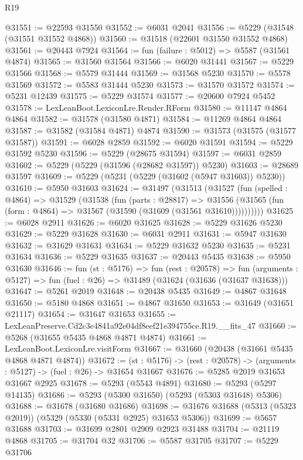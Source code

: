 \begin{lexlean}{R19}
\begin{coremodule}
@31551 := @22593 @31550
@31552 := @6031 @2041
@31556 := @5229 (@31548 (@31551 @31552 @4868))
@31560 := @31518 (@22601 @31550 @31552 @4868)
@31561 := @20443 @7924
@31564 := fun (failure : @5012) => @5587 (@31561 @4874)
@31565 := @31560 @31564
@31566 := @6020 @31441
@31567 := @5229 @31566
@31568 := @5579 @31444
@31569 := @31568 @5230
@31570 := @5578 @31569
@31572 := @5583 @31444 @5230
@31573 := @31570 @31572
@31574 := @5231 @12439
@31575 := @5229 @31574
@31577 := @20600 @7924 @5452
@31578 := LexLeanBoot.LexiconLre.Render.RForm
@31580 := @11147 @4864 @4864
@31582 := @31578 (@31580 @4871)
@31584 := @11269 @4864 @4864
@31587 := @31582 (@31584 @4871) @4874
@31590 := @31573 (@31575 (@31577 @31587))
@31591 := @6028 @2859
@31592 := @6020 @31591
@31594 := @5229 @31592 @5230
@31596 := @5229 (@28675 @31594)
@31597 := @6031 @2859
@31602 := @5229 (@5229 (@31596 (@28682 @31597)) @5230)
@31603 := @28689 @31597
@31609 := @5229 (@5231 (@5229 (@31602 (@5947 @31603)) @5230))
@31610 := @5950 @31603
@31624 := @31497
    (@31513
      (@31527
        (fun (spelled : @4864) =>
        @31529
          (@31538
            (fun (parts : @28817) =>
            @31556 (@31565 (fun (form : @4864) => @31567 (@31590 (@31609 (@31561 @31610))))))))))
@31625 := @6028 @2911
@31626 := @6020 @31625
@31628 := @5229 @31626 @5230
@31629 := @5229 @31628
@31630 := @6031 @2911
@31631 := @5947 @31630
@31632 := @31629 @31631
@31634 := @5229 @31632 @5230
@31635 := @5231 @31634
@31636 := @5229 @31635
@31637 := @20443 @5435
@31638 := @5950 @31630
@31646 := fun (st : @5176) =>
  fun (rest : @20578) =>
  fun (arguments : @5127) => fun (fuel : @26) => @31489 (@31624 (@31636 (@31637 @31638)))
@31647 := @5261 @2019
@31648 := @20438 @5435
@31649 := @4867 @31648
@31650 := @5180 @4868
@31651 := @4867 @31650
@31653 := @31649 (@31651 @21117)
@31654 := @31647 @31653
@31655 := LexLeanPreserve.Cd2c3e4841a92e04df8eef21e394755ce.R19.__fits_47
@31660 := @5268 (@31655 @5435 @4868 @4871 @4874)
@31661 := LexLeanBoot.LexiconLre.visitForm
@31667 := @31660 (@20438 (@31661 @5435 @4868 @4871 @4874))
@31672 := (st : @5176) -> (rest : @20578) -> (arguments : @5127) -> (fuel : @26) -> @31654 @31667
@31676 := @5285 @2019 @31653 @31667 @2925
@31678 := @5293 (@5543 @4891)
@31680 := @5293 (@5297 @14135)
@31686 := @5293 (@5300 @31650) (@5293 (@5303 @31648) @5306)
@31688 := @31678 (@31680 @31686)
@31698 := @31676 @31688 (@5313 (@5323 @2019)) (@5329 (@5330 (@5331 @2925) @31653 @5306))
@31699 := @5657 @31688
@31703 := @31699 @2801 @2909 @2923 @31488
@31704 := @21119 @4868
@31705 := @31704 @32
@31706 := @5587 @31705
@31707 := @5229 @31706

\end{coremodule}
\end{lexlean}
